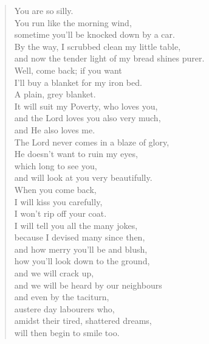 \documentclass[11pt]{book}
\newcommand*{\centeredornament}{\centerline{\pgfornament[width=6cm]{88}}}
\begin{document}
\newpage

\vspace*{-15mm}
\centeredornament




\begin{verse}
  You are so silly. \\
  You run like the morning wind, \\
  sometime you'll be knocked down by a car. \\
  By the way, I scrubbed clean my little table, \\
  and now the tender light of my bread shines purer. \\
  Well, come back; if you want \\
  I'll buy a blanket for my iron bed. \\
  A plain, grey blanket. \\
  It will suit my Poverty, who loves you, \\
  and the Lord loves you also very much, \\
  and He also loves me. \\
  The Lord never comes in a blaze of glory, \\
  He doesn't want to ruin my eyes, \\
  which long to see you, \\
  and will look at you very beautifully. \\
  When you come back, \\
  I will kiss you carefully, \\
  I won't rip off your coat. \\
  I will tell you all the many jokes, \\
  because I devised many since then, \\
  and how merry you'll be and blush, \\
  how you'll look down to the ground, \\
  and we will crack up, \\
  and we will be heard by our neighbours \\
  and even by the taciturn, \\
  austere day labourers who, \\
  amidst their tired, shattered dreams, \\
  will then begin to smile too.
\end{verse}
\end{document}
